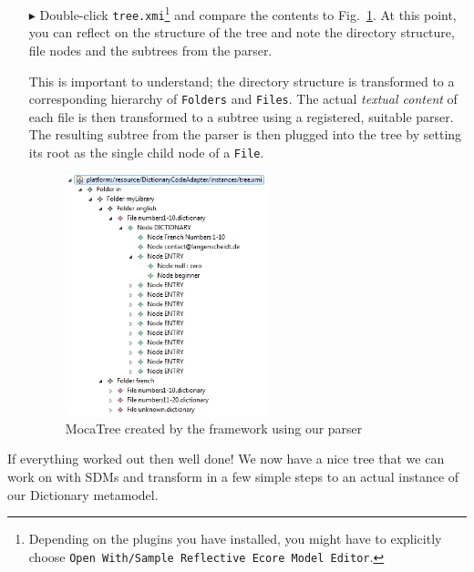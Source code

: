 \begin{enumerate}
  \item[$\blacktriangleright$] Double-click \texttt{tree.xmi}\footnote{Depending on the plugins you have installed, you might have to explicitly choose \texttt{Open With/Sample Reflective Ecore Model Editor}.} and compare the contents to Fig.~\ref{fig:moca-10-ParseResult2}. At this point, you can reflect on the structure of the tree and note the directory structure, file nodes and the subtrees from the parser.
  
This is important to understand; the directory structure is transformed to a corresponding hierarchy of \texttt{Folders} and \texttt{Files}.
The actual \emph{textual content} of each file is then transformed to a subtree using a registered, suitable parser.
The resulting subtree from the parser is then plugged into the tree by setting its root as the single child node of a \texttt{File}.
\begin{figure}[!htbp]
\begin{center}
 \includegraphics[width=0.55\textwidth]{pics/moca/2TextToMocaTree/10-ParseResult2}
  \caption{MocaTree created by the framework using our parser}
  \label{fig:moca-10-ParseResult2}
\end{center}
\end{figure}
\end{enumerate}

If everything worked out then well done!  We now have a nice tree that we can work on with SDMs and transform in a few simple steps to an actual instance of our Dictionary metamodel.